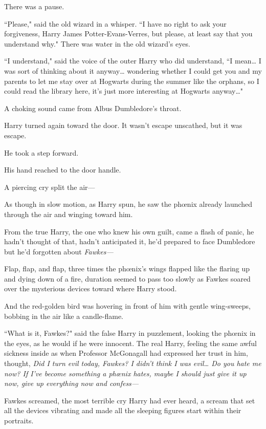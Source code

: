 There was a pause.

``Please," said the old wizard in a whisper. ``I have no right to ask your forgiveness, Harry James Potter-Evans-Verres, but please, at least say that you understand why." There was water in the old wizard's eyes.

``I understand," said the voice of the outer Harry who did understand, ``I mean{\ldots} I was sort of thinking about it anyway{\ldots} wondering whether I could get you and my parents to let me stay over at Hogwarts during the summer like the orphans, so I could read the library here, it's just more interesting at Hogwarts anyway{\ldots}"

A choking sound came from Albus Dumbledore's throat.

Harry turned again toward the door. It wasn't escape unscathed, but it was escape.

He took a step forward.

His hand reached to the door handle.

A piercing cry split the air—

As though in slow motion, as Harry spun, he saw the phœnix already launched through the air and winging toward him.

From the true Harry, the one who knew his own guilt, came a flash of panic, he hadn't thought of that, hadn't anticipated it, he'd prepared to face Dumbledore but he'd forgotten about \emph{Fawkes—}

Flap, flap, and flap, three times the phœnix's wings flapped like the flaring up and dying down of a fire, duration seemed to pass too slowly as Fawkes soared over the mysterious devices toward where Harry stood.

And the red-golden bird was hovering in front of him with gentle wing-sweeps, bobbing in the air like a candle-flame.

``What is it, Fawkes?" said the false Harry in puzzlement, looking the phœnix in the eyes, as he would if he were innocent. The real Harry, feeling the same awful sickness inside as when Professor McGonagall had expressed her trust in him, thought, \emph{Did I turn evil today, Fawkes? I didn't think I was evil{\ldots} Do you hate me now? If I've become something a phœnix hates, maybe I should just give it up now, give up everything now and confess—}

Fawkes screamed, the most terrible cry Harry had ever heard, a scream that set all the devices vibrating and made all the sleeping figures start within their portraits.

